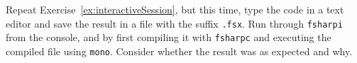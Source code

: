 Repeat Exercise~\ref{ex:interactiveSession}, but this time, type the code in a text editor and save the result in a file with the suffix \verb|.fsx|. Run through \lstinline[language=console]{fsharpi} from the console, and by first compiling it with \lstinline[language=console]{fsharpc} and executing the compiled file using \lstinline[language=console]{mono}. Consider whether the result was as expected and why.